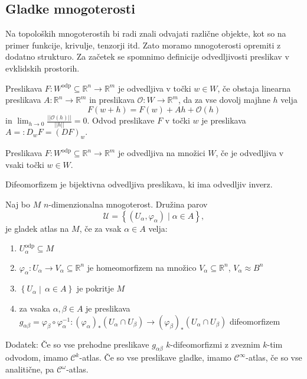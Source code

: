 \subsection{Gladke mnogoterosti}%

Na topoloških mnogoterostih bi radi znali odvajati različne objekte,
kot so na primer funkcije, krivulje, tenzorji itd. Zato moramo
mnogoterosti opremiti z dodatno strukturo. Za začetek se spomnimo
definicije odvedljivosti preslikav v evklidskih prostorih.

\begin{definicija}
Preslikava $F: W^{\text{odp}} \subseteq
\mathbb{R}^n \to \mathbb{R}^m$ je odvedljiva v točki $w \in W$, če
obstaja linearna preslikava $A : \mathbb{R}^n \to \mathbb{R}^m$ in
preslikava $\mathcal{O}: W \to \mathbb{R}^m$, da za vse dovolj majhne $h$ velja \begin{equation*} F\left( w + h \right) = F\left( w \right) + Ah
+ \mathcal{O}\left( h \right)\end{equation*} in $\lim_{h \to 0}
\frac{\lvert\lvert \mathcal{O}\left( h \right) \rvert\rvert
}{\lvert\lvert h \rvert\rvert } = 0.$ Odvod preslikave $F$ v točki $w$
je preslikava $A =: D_wF = \left( DF \right)_w.$
\end{definicija}


\begin{definicija}
\label{def_odvedljivost}
Preslikava $F: W^{\text{odp}} \subseteq  \mathbb{R}^n \to \mathbb{R}^m$ je odvedljiva
na množici $W$, če je odvedljiva v vsaki točki $w \in
W$.
\end{definicija}

\begin{definicija} \label{def_difeomorfizem} Difeomorfizem je
bijektivna odvedljiva preslikava, ki ima odvedljiv inverz. 
\end{definicija}

\begin{definicija}
\label{def_atlas}
Naj bo $M$ $n$-dimenzionalna mnogoterost. Družina parov $$\mathcal{U} = \left\{ \left( U_\alpha, \varphi_\alpha\right)
\mid \alpha \in  A \right\},$$ je gladek atlas na $M$, če za vsak $\alpha \in A$ velja:
\begin{enumerate}
 \item $U_\alpha^{\text{odp}} \subseteq M$
 \item $\varphi_\alpha: U_\alpha \to V_\alpha \subseteq \mathbb{R}^n$
je homeomorfizem na množico $V_\alpha \subseteq \mathbb{R}^n$, $V_\alpha \approx B^{n}$
 \item $\left\{ U_\alpha \middle|\, \alpha\in  A \right\}$ je
pokritje $M$ \item za vsaka $\alpha, \beta \in A$ je
preslikava $g_{\alpha \beta}  = \varphi_\beta \circ
\varphi_\alpha^{-1}: (\varphi_\alpha)_{*}(U_\alpha \cap
U_\beta) \to(\varphi_\beta)_{*}(U_\alpha \cap  U_\beta)$
difeomorfizem 
\end{enumerate}
Dodatek: Če so vse prehodne
preslikave $g_{\alpha \beta}$  $k$-difeomorfizmi z zveznim $k$-tim
odvodom, imamo $\mathcal{C}^{k}$-atlas. Če so vse preslikave gladke,
imamo $\mathcal{C}^{\infty}$-atlas, če so vse analitične, pa
$\mathcal{C}^{\omega}$-atlas.     
\end{definicija}

